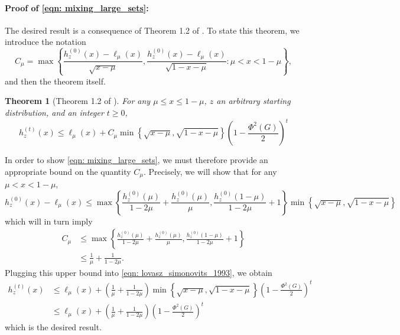 \documentclass[11pt,twoside]{article}
\newtheorem{theorem}{Theorem}
\newcommand{\set}[1]{\left\{#1\right\}}
\newcommand{\1}{\mathbf{1}}
\begin{document}
\paragraph{Proof of \eqref{eqn: mixing_large_sets}:}
The desired result is a consequence of Theorem 1.2 of \cite{lovasz1990}. To state this theorem, we introduce the notation
\begin{equation*}
C_{\mu} = \max \set{\frac{h_z^{(0)}(x) - \ell_{\mu}(x)}{\sqrt{x - \mu}}, \frac{h_z^{(0)}(x) - \ell_{\mu}(x)}{\sqrt{1 - x - \mu}}: \mu < x < 1 - \mu},
\end{equation*}
and then the theorem itself.
\begin{theorem}[Theorem 1.2 of \cite{lovasz1990}]
	\label{thm: lovasz_simonovits_1993}
	For any $\mu \leq x \leq 1 - \mu$, $z$ an arbitrary starting distribution, and an integer $t \geq 0$,
	\begin{equation}
	\label{eqn: lovasz_simonovits_1993}
	h_z^{(t)}(x) \leq \ell_{\mu}(x) + C_{\mu} \min \set{\sqrt{x - \mu}, \sqrt{1 - x - \mu}} \left(1 - \frac{\Phi^2(G)}{2}\right)^t
	\end{equation}
\end{theorem}
In order to show \eqref{eqn: mixing_large_sets}, we must therefore provide an appropriate bound on the quantity $C_{\mu}$. Precisely, we will show that for any $\mu < x < 1 - \mu$,
\begin{equation}
\label{eqn: lt_ub_1}
h_z^{(0)}(x) - \ell_{\mu}(x) \leq \max \set{\frac{h_z^{(0)}(\mu)}{1 - 2\mu} + \frac{h_z^{(0)}(\mu)}{\mu} , \frac{h_z^{(0)}(1 - \mu) }{1 - 2\mu} + 1 } \min \set{\sqrt{x - \mu},\sqrt{1 - x - \mu}}
\end{equation}
which will in turn imply
\begin{align*}
C_{\mu} & \leq \max \set{\frac{h_z^{(0)}(\mu)}{1 - 2\mu} + \frac{h_z^{(0)}(\mu)}{\mu} , \frac{h_z^{(0)}(1 - \mu) }{1 - 2\mu} + 1 } \\
& \leq \frac{1}{\mu} + \frac{1}{1 - 2\mu}.
\end{align*}
Plugging this upper bound into \eqref{eqn: lovasz_simonovits_1993}, we obtain
\begin{align*}
h_z^{(t)}(x) & \leq \ell_{\mu}(x) +  \left(\frac{1}{\mu} + \frac{1}{1 - 2\mu}\right)\min \set{\sqrt{x - \mu}, \sqrt{1 - x - \mu}} \left(1 - \frac{\Phi^2(G)}{2}\right)^t \\
& \leq \ell_{\mu}(x) +  \left(\frac{1}{\mu} + \frac{1}{1 - 2\mu}\right)\left(1 - \frac{\Phi^2(G)}{2}\right)^t
\end{align*}
which is the desired result.
\end{document}
